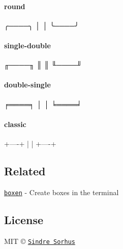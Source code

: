 \paragraph*{{\ttfamily round}}


\begin{DoxyCode}
╭────╮
│    │
╰────╯
\end{DoxyCode}


\paragraph*{{\ttfamily single-\/double}}


\begin{DoxyCode}
╓────╖
║    ║
╙────╜
\end{DoxyCode}


\paragraph*{{\ttfamily double-\/single}}


\begin{DoxyCode}
╒════╕
│    │
╘════╛
\end{DoxyCode}


\paragraph*{{\ttfamily classic}}


\begin{DoxyCode}
+----+
|    |
+----+
\end{DoxyCode}


\subsection*{Related}


\begin{DoxyItemize}
\item \href{https://github.com/sindresorhus/boxen}{\tt boxen} -\/ Create boxes in the terminal
\end{DoxyItemize}

\subsection*{License}

M\+IT © \href{http://sindresorhus.com}{\tt Sindre Sorhus} 